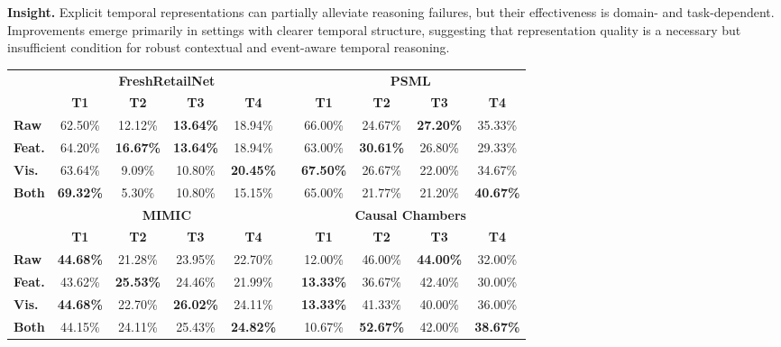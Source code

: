 \begin{insightbox}
\textbf{Insight.}
Explicit temporal representations can partially alleviate reasoning failures, but their effectiveness is domain- and task-dependent. Improvements emerge primarily in settings with clearer temporal structure, suggesting that representation quality is a necessary but insufficient condition for robust contextual and event-aware temporal reasoning.
\end{insightbox}



\begin{table}[htbp]
\vspace{-10pt}
\centering
\footnotesize
\setlength{\tabcolsep}{2.6pt}
\renewcommand{\arraystretch}{1}

\newcommand{\rowvbar}{\raisebox{-0.55ex}{\rule{0.45pt}{2.6ex}}}

\begin{tabular}{lcccc c cccc}
\toprule
& \multicolumn{4}{c}{\textbf{FreshRetailNet}} & & \multicolumn{4}{c}{\textbf{PSML}} \\
\cmidrule(lr){2-5}\cmidrule(lr){7-10}
\textbf{} & \textbf{T1} & \textbf{T2} & \textbf{T3} & \textbf{T4} & \rowvbar
& \textbf{T1} & \textbf{T2} & \textbf{T3} & \textbf{T4} \\
\midrule
\textbf{Raw}      & 62.50\% & 12.12\% & \textbf{13.64\%} & 18.94\% & \rowvbar & 66.00\% & 24.67\% & \textbf{27.20\%} & 35.33\% \\
\textbf{Feat.}       & 64.20\% & \textbf{16.67\%} & \textbf{13.64\%} & 18.94\% & \rowvbar & 63.00\% & \textbf{30.61\%} & 26.80\% & 29.33\% \\
\textbf{Vis.}   & 63.64\% & 9.09\%  & 10.80\% & \textbf{20.45\%} & \rowvbar & \textbf{67.50\%} & 26.67\% & 22.00\% & 34.67\% \\
 \textbf{Both}   & \textbf{69.32\%} & 5.30\% & 10.80\% & 15.15\% & \rowvbar & 65.00\% & 21.77\% & 21.20\% & \textbf{40.67\%} \\
\midrule
& \multicolumn{4}{c}{\textbf{MIMIC}} & & \multicolumn{4}{c}{\textbf{Causal Chambers}} \\
\cmidrule(lr){2-5}\cmidrule(lr){7-10}
\textbf{} & \textbf{T1} & \textbf{T2} & \textbf{T3} & \textbf{T4} & \rowvbar
& \textbf{T1} & \textbf{T2} & \textbf{T3} & \textbf{T4} \\
\midrule
\textbf{Raw}      & \textbf{44.68\%} & 21.28\% & 23.95\% & 22.70\% & \rowvbar & 12.00\% & 46.00\% & \textbf{44.00\%} & 32.00\% \\
\textbf{Feat.}        & 43.62\% & \textbf{25.53\%} & 24.46\% & 21.99\% & \rowvbar & \textbf{13.33\%} & 36.67\% & 42.40\% & 30.00\% \\
 \textbf{Vis.}   & \textbf{44.68\%} & 22.70\% & \textbf{26.02\%} & 24.11\% & \rowvbar & \textbf{13.33\%} & 41.33\% & 40.00\% & 36.00\% \\
 \textbf{Both}   & 44.15\% & 24.11\% & 25.43\% & \textbf{24.82\%} & \rowvbar & 10.67\% & \textbf{52.67\%} & 42.00\% & \textbf{38.67\%} \\
\bottomrule
\end{tabular}



\end{table}
